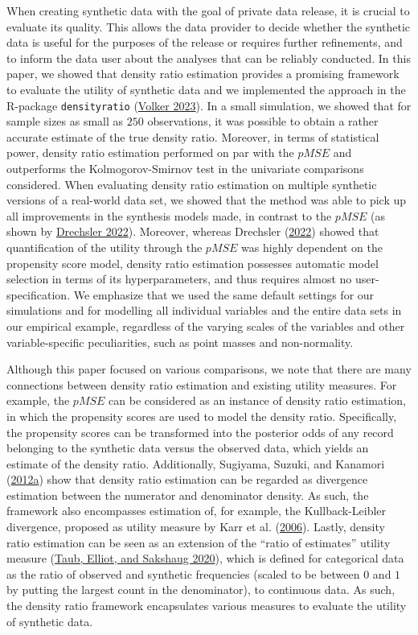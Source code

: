 \documentclass[
]{template/style/uneceart}
\begin{document}
When creating synthetic data with the goal of private data release, it
is crucial to evaluate its quality. This allows the data provider to
decide whether the synthetic data is useful for the purposes of the
release or requires further refinements, and to inform the data user
about the analyses that can be reliably conducted. In this paper, we
showed that density ratio estimation provides a promising framework to
evaluate the utility of synthetic data and we implemented the approach
in the R-package \texttt{densityratio}
(\protect\hyperlink{ref-densityratio}{Volker 2023}). In a small
simulation, we showed that for sample sizes as small as \(250\)
observations, it was possible to obtain a rather accurate estimate of
the true density ratio. Moreover, in terms of statistical power, density
ratio estimation performed on par with the \(pMSE\) and outperforms the
Kolmogorov-Smirnov test in the univariate comparisons considered. When
evaluating density ratio estimation on multiple synthetic versions of a
real-world data set, we showed that the method was able to pick up all
improvements in the synthesis models made, in contrast to the \(pMSE\)
(as shown by \protect\hyperlink{ref-drechsler_utility_2022}{Drechsler
2022}). Moreover, whereas Drechsler
(\protect\hyperlink{ref-drechsler_utility_2022}{2022}) showed that
quantification of the utility through the \(pMSE\) was highly dependent
on the propensity score model, density ratio estimation possesses
automatic model selection in terms of its hyperparameters, and thus
requires almost no user-specification. We emphasize that we used the
same default settings for our simulations and for modelling all
individual variables and the entire data sets in our empirical example,
regardless of the varying scales of the variables and other
variable-specific peculiarities, such as point masses and non-normality.

Although this paper focused on various comparisons, we note that there
are many connections between density ratio estimation and existing
utility measures. For example, the \(pMSE\) can be considered as an
instance of density ratio estimation, in which the propensity scores are
used to model the density ratio. Specifically, the propensity scores can
be transformed into the posterior odds of any record belonging to the
synthetic data versus the observed data, which yields an estimate of the
density ratio. Additionally, Sugiyama, Suzuki, and Kanamori
(\protect\hyperlink{ref-sugiyama_suzuki_kanamori_2012}{2012a}) show that
density ratio estimation can be regarded as divergence estimation
between the numerator and denominator density. As such, the framework
also encompasses estimation of, for example, the Kullback-Leibler
divergence, proposed as utility measure by Karr et al.
(\protect\hyperlink{ref-karr_utility_2006}{2006}). Lastly, density ratio
estimation can be seen as an extension of the ``ratio of estimates''
utility measure (\protect\hyperlink{ref-taub2020}{Taub, Elliot, and
Sakshaug 2020}), which is defined for categorical data as the ratio of
observed and synthetic frequencies (scaled to be between \(0\) and \(1\)
by putting the largest count in the denominator), to continuous data. As
such, the density ratio framework encapsulates various measures to
evaluate the utility of synthetic data.
\end{document}
